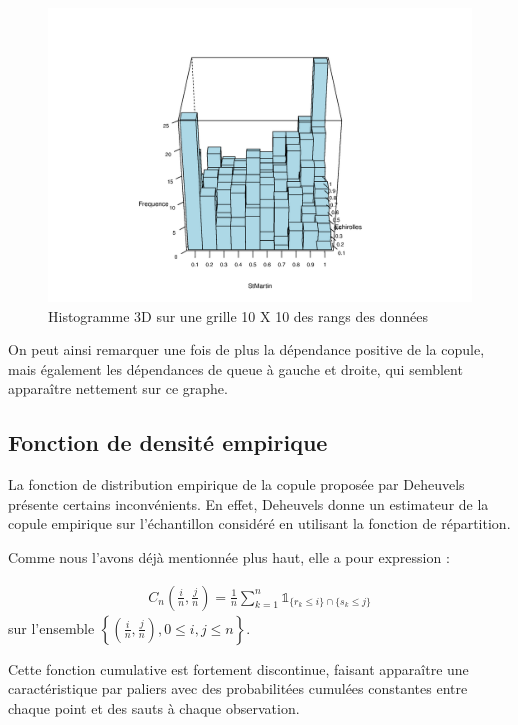 \noindent%
\begin{figure}[H]
    \begin{center}
      \includegraphics[width=14 cm, angle=0]{./pictures/hist3d.png}
      \centering\caption{Histogramme 3D sur une grille 10 X 10 des rangs des données}
    \end{center}
\end{figure}

On peut ainsi remarquer une fois de plus la dépendance positive de la copule, mais également les dépendances de queue à gauche et droite, qui semblent apparaître nettement sur ce graphe.

\subsection{Fonction de densité empirique}

La fonction de distribution empirique de la copule proposée par Deheuvels présente certains inconvénients.
En effet, Deheuvels donne un estimateur de la copule empirique sur l'échantillon considéré en utilisant la 
fonction de répartition.

Comme nous l'avons déjà mentionnée plus haut, elle a pour expression :

\begin{eqnarray*}
C_n \left( \frac{i}{n},\frac{j}{n}\right) = \frac{1}{n} \sum_{k=1}^n \mathbb{1}_{ \{r_k \leq i\} \cap \{ s_k \leq j\} } 
\end{eqnarray*}
sur l'ensemble $\left \{ \left( \frac{i}{n} , \frac{j}{n} \right) , 0 \leq i,j \leq n   \right \}$.

Cette fonction cumulative est fortement discontinue, faisant apparaître une caractéristique par paliers avec des probabilitées cumulées constantes
entre chaque point et des sauts à chaque observation.

